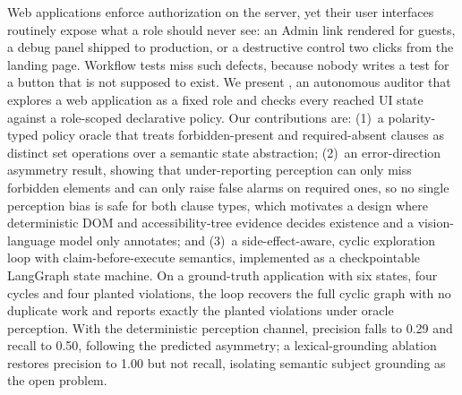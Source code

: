 Web applications enforce authorization on the server, yet their user
interfaces routinely expose what a role should never see: an Admin link
rendered for guests, a debug panel shipped to production, or a destructive
control two clicks from the landing page. Workflow tests miss such defects,
because nobody writes a test for a button that is not supposed to exist. We
present \sys{}, an autonomous auditor that explores a web application as a
fixed role and checks every reached UI state against a role-scoped declarative
policy. Our contributions are: (1)~a polarity-typed policy oracle that treats
forbidden-present and required-absent clauses as distinct set operations over
a semantic state abstraction; (2)~an error-direction asymmetry result, showing
that under-reporting perception can only miss forbidden elements and can only
raise false alarms on required ones, so no single perception bias is safe for
both clause types, which motivates a design where deterministic DOM and
accessibility-tree evidence decides existence and a vision-language model only
annotates; and (3)~a side-effect-aware, cyclic exploration loop with
claim-before-execute semantics, implemented as a checkpointable LangGraph
state machine. On a ground-truth application with six states, four cycles and
four planted violations, the loop recovers the full cyclic graph with no
duplicate work and reports exactly the planted violations under oracle
perception. With the deterministic perception channel, precision falls to 0.29
and recall to 0.50, following the predicted asymmetry; a lexical-grounding
ablation restores precision to 1.00 but not recall, isolating semantic subject
grounding as the open problem.
